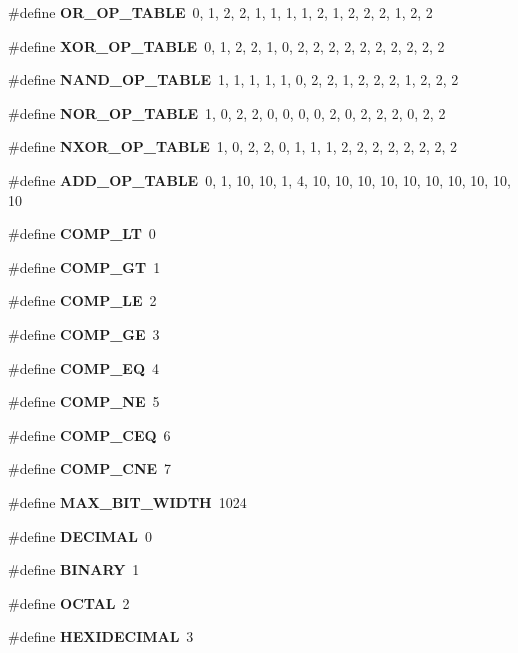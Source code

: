 \begin{CompactItemize}
$$\item 
\#define {\bf OR\_\-OP\_\-TABLE}\ 0,  1,  2,  2,  1,  1,  1,  1,  2,  1,  2,  2,  2,  1,  2,  2
\item 
\#define {\bf XOR\_\-OP\_\-TABLE}\ 0,  1,  2,  2,  1,  0,  2,  2,  2,  2,  2,  2,  2,  2,  2,  2
\item 
\#define {\bf NAND\_\-OP\_\-TABLE}\ 1,  1,  1,  1,  1,  0,  2,  2,  1,  2,  2,  2,  1,  2,  2,  2
\item 
\#define {\bf NOR\_\-OP\_\-TABLE}\ 1,  0,  2,  2,  0,  0,  0,  0,  2,  0,  2,  2,  2,  0,  2,  2
\item 
\#define {\bf NXOR\_\-OP\_\-TABLE}\ 1,  0,  2,  2,  0,  1,  1,  1,  2,  2,  2,  2,  2,  2,  2,  2
\item 
\#define {\bf ADD\_\-OP\_\-TABLE}\ 0,  1,  10, 10, 1,  4,  10, 10, 10, 10, 10, 10, 10, 10, 10, 10
\item 
\#define {\bf COMP\_\-LT}\ 0
\item 
\#define {\bf COMP\_\-GT}\ 1
\item 
\#define {\bf COMP\_\-LE}\ 2
\item 
\#define {\bf COMP\_\-GE}\ 3
\item 
\#define {\bf COMP\_\-EQ}\ 4
\item 
\#define {\bf COMP\_\-NE}\ 5
\item 
\#define {\bf COMP\_\-CEQ}\ 6
\item 
\#define {\bf COMP\_\-CNE}\ 7
\item 
\#define {\bf MAX\_\-BIT\_\-WIDTH}\ 1024
\item 
\#define {\bf DECIMAL}\ 0
\item 
\#define {\bf BINARY}\ 1
\item 
\#define {\bf OCTAL}\ 2
\item 
\#define {\bf HEXIDECIMAL}\ 3
\end{CompactItemize}

